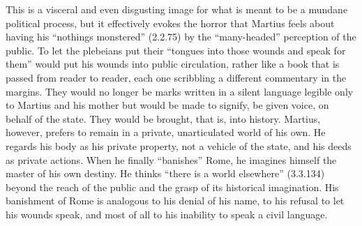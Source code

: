 This is a visceral and even disgusting image for what is meant to be a mundane political process, but it effectively evokes the horror that Martius feels about having his ``nothings monstered'' (2.2.75) by the ``many-headed'' perception of the public.
To let the plebeians put their ``tongues into those wounds and speak for them'' would put his wounds into public circulation, rather like a book that is passed from reader to reader, each one scribbling a different commentary in the margins.
They would no longer be marks written in a silent language legible only to Martius and his mother but would be made to signify, be given voice, on behalf of the state.
They would be brought, that is, into history.
Martius, however, prefers to remain in a private, unarticulated world of his own.
He regards his body as his private property, not a vehicle of the state, and his deeds as private actions.
When he finally ``banishes'' Rome, he imagines himself the master of his own destiny.
He thinks ``there is a world elsewhere'' (3.3.134) beyond the reach of the public and the grasp of its historical imagination.
His banishment of Rome is analogous to his denial of his name, to his refusal to let his wounds speak, and most of all to his inability to speak a civil language.

